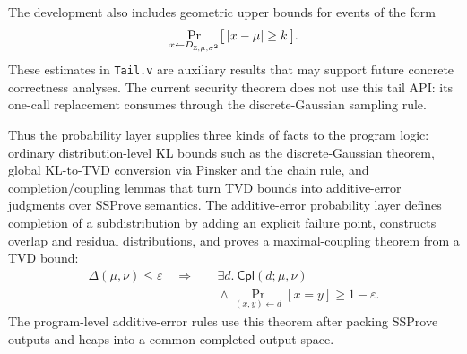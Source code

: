 The development also includes geometric upper bounds for events of the form
\[
  \Pr_{x\gets D_{\mathbb{Z},\mu,\sigma^2}}
    \bigl[\, |x-\mu|\geq k\,\bigr].
\]
These estimates in \texttt{Tail.v} are auxiliary results that may support
future concrete correctness analyses.
The current security theorem does not use this tail API:
its one-call replacement consumes  through the
discrete-Gaussian sampling rule.

Thus the probability layer supplies three kinds of facts to the program logic:
ordinary distribution-level KL bounds such as the discrete-Gaussian theorem,
global KL-to-TVD conversion via Pinsker and the chain rule,
and completion/coupling lemmas that turn TVD bounds into additive-error
judgments over SSProve semantics.
The additive-error probability layer defines completion of a subdistribution
by adding an explicit failure point, constructs overlap and residual
distributions, and proves a maximal-coupling theorem from a TVD bound:
\begin{align*}
  \Delta(\mu,\nu)\leq \varepsilon
  \quad\Longrightarrow\quad&
  \exists d.\ \mathsf{Cpl}(d;\mu,\nu)\\
  &{}\wedge
  \Pr_{(x,y)\gets d}[x=y]\geq 1-\varepsilon .
\end{align*}
The program-level additive-error rules use this theorem after packing SSProve
outputs and heaps into a common completed output space.
